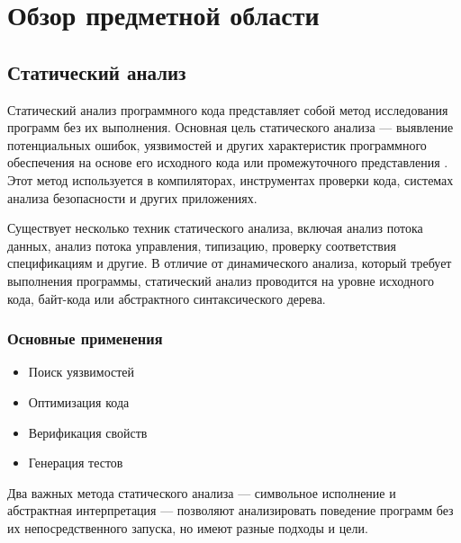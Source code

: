 \section{Обзор предметной области}

\subsection{Статический анализ}

Статический анализ программного кода представляет собой метод исследования программ без их выполнения. Основная цель статического анализа — выявление потенциальных ошибок, уязвимостей и других характеристик программного обеспечения на основе его исходного кода или промежуточного представления \cite{CousotCousot77}. Этот метод используется в компиляторах, инструментах проверки кода, системах анализа безопасности и других приложениях.

Существует несколько техник статического анализа, включая анализ потока данных, анализ потока управления, типизацию, проверку соответствия спецификациям и другие. В отличие от динамического анализа, который требует выполнения программы, статический анализ проводится на уровне исходного кода, байт-кода или абстрактного синтаксического дерева.

\begin{center}
\end{center}

\subsubsection*{Основные применения}
\begin{itemize}
    \item Поиск уязвимостей
    \item Оптимизация кода
    \item Верификация свойств
    \item Генерация тестов
\end{itemize}

Два важных метода статического анализа — символьное исполнение и абстрактная интерпретация — позволяют анализировать поведение программ без их непосредственного запуска, но имеют разные подходы и цели.




